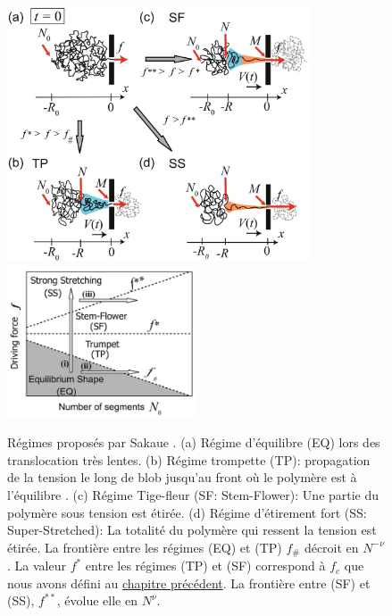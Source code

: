 \begin{figure}[H]
\begin{center}
\includegraphics[width=0.8\textwidth]{regimesprofiles.jpg}
\includegraphics[width=0.5\textwidth]{regimedistrib.jpg} 

\caption[Régimes possibles au cours de la translocation]{Régimes proposés par Sakaue \cite{Saito2011}. (a) Régime d'équilibre (EQ) lors des translocation très lentes. (b) Régime trompette (TP): propagation de la tension le long de blob jusqu’au front où le polymère est à l'équilibre . (c) Régime Tige-fleur (SF: Stem-Flower): Une partie du polymère sous tension est étirée. (d) Régime d'étirement fort (SS: Super-Stretched): La totalité du polymère qui ressent la tension est étirée. La frontière entre les régimes (EQ) et (TP) $f_{\#}$ décroit en $N^{-\nu}$. La valeur $f^*$ entre les régimes (TP) et (SF) correspond à $f_c$ que nous avons défini au \hyperref[fc]{chapitre précédent}. La frontière entre (SF) et (SS), $f^{**}$, évolue elle en $N^{\nu}$. }
\label{regimeprofiles}
\end{center}
\end{figure}
 
